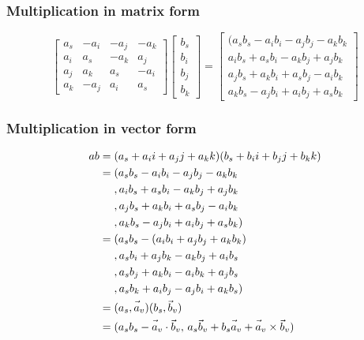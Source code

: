 \documentclass{article}
\newcommand{\fvec}[1]{\vec{\vphantom{A}#1}}
\begin{document}
\subsubsection{Multiplication in matrix form}
$$ \begin{bmatrix}
    a_{s} & -a_{i} & -a_{j} & -a_{k} \\
    a_{i} & a_{s} & -a_{k} & a_{j} \\
    a_{j} & a_{k} & a_{s} & -a_{i} \\
    a_{k} & -a_{j} & a_{i} & a_{s}
\end{bmatrix}
\begin{bmatrix} b_{s} \\ b_{i} \\ b_{j} \\ b_{k} \end{bmatrix} =
\begin{bmatrix}
    (a_{s}b_{s} - a_{i}b_{i} - a_{j}b_{j} - a_{k}b_{k} \\
    a_{i}b_{s} + a_{s}b_{i} - a_{k}b_{j} + a_{j}b_{k} \\
    a_{j}b_{s} + a_{k}b_{i} + a_{s}b_{j} - a_{i}b_{k} \\
    a_{k}b_{s} - a_{j}b_{i} + a_{i}b_{j} + a_{s}b_{k}
\end{bmatrix} $$

\subsubsection{Multiplication in vector form}
\begin{equation}
\begin{split}
ab & = (a_{s} + a_{i}i + a_{j}j + a_{k}k)(b_{s} + b_{i}i + b_{j}j + b_{k}k) \\
    & = (a_{s}b_{s} - a_{i}b_{i} - a_{j}b_{j} - a_{k}b_{k} \\
    & \ \ \ \ , a_{i}b_{s} + a_{s}b_{i} - a_{k}b_{j} + a_{j}b_{k} \\
    & \ \ \ \ , a_{j}b_{s} + a_{k}b_{i} + a_{s}b_{j} - a_{i}b_{k} \\
    & \ \ \ \ , a_{k}b_{s} - a_{j}b_{i} + a_{i}b_{j} + a_{s}b_{k}) \\
    & = (a_{s}b_{s} - (a_{i}b_{i} + a_{j}b_{j} + a_{k}b_{k}) \\
    & \ \ \ \ , a_{s}b_{i} + a_{j}b_{k} - a_{k}b_{j} + a_{i}b_{s} \\
    & \ \ \ \ , a_{s}b_{j} + a_{k}b_{i} - a_{i}b_{k} + a_{j}b_{s} \\
    & \ \ \ \ , a_{s}b_{k} + a_{i}b_{j} - a_{j}b_{i} + a_{k}b_{s}) \\
    & = (a_{s}, \fvec{a}_{v})(b_{s}, \fvec{b}_{v}) \\
    & = (a_{s} b_{s} - \fvec{a}_{v} \cdot \fvec{b}_{v}, \, a_{s} \fvec{b}_{v} + b_{s} \fvec{a}_{v} + \fvec{a}_{v} \times \fvec{b}_{v}) \\
\end{split}
\end{equation}
\end{document}
